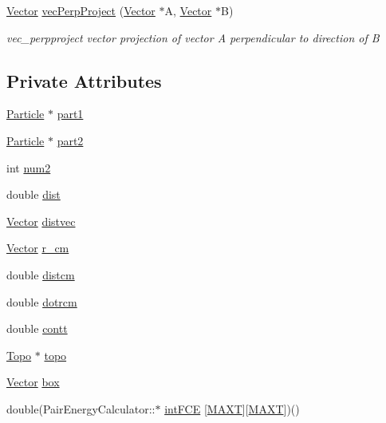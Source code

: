 \begin{DoxyCompactItemize}
\hyperlink{class_vector}{Vector} \hyperlink{class_pair_energy_calculator_abf018dcd60f682fbc69e7f3d59aec1b5}{vec\+Perp\+Project} (\hyperlink{class_vector}{Vector} $\ast$A, \hyperlink{class_vector}{Vector} $\ast$B)
\begin{DoxyCompactList}\small\item\em vec\+\_\+perpproject vector projection of vector A perpendicular to direction of B \end{DoxyCompactList}\end{DoxyCompactItemize}
\subsection*{Private Attributes}
\begin{DoxyCompactItemize}
\item 
\hyperlink{class_particle}{Particle} $\ast$ \hyperlink{class_pair_energy_calculator_a168122b4b21b48d25093a9e314045929}{part1}
\item 
\hyperlink{class_particle}{Particle} $\ast$ \hyperlink{class_pair_energy_calculator_a5930e66e7a0e9c3b2bd7e76391854ad2}{part2}
\item 
int \hyperlink{class_pair_energy_calculator_a437c68a040fd7eb9f261bc2c22cf3bcf}{num2}
\item 
double \hyperlink{class_pair_energy_calculator_a088da797962434ca91db0371df26658f}{dist}
\item 
\hyperlink{class_vector}{Vector} \hyperlink{class_pair_energy_calculator_a55811135e825d49327759d985d97b411}{distvec}
\item 
\hyperlink{class_vector}{Vector} \hyperlink{class_pair_energy_calculator_aa927503ba2066bfcd0fb072e0b7e12cc}{r\+\_\+cm}
\item 
double \hyperlink{class_pair_energy_calculator_a458286e3bf6945bcbbfbb8f6cf5176f5}{distcm}
\item 
double \hyperlink{class_pair_energy_calculator_a900648b1736a83a26032f362826a03b7}{dotrcm}
\item 
double \hyperlink{class_pair_energy_calculator_a65d98db836fcf54e21274113ba3f42c4}{contt}
\item 
\hyperlink{class_topo}{Topo} $\ast$ \hyperlink{class_pair_energy_calculator_a89462e46d51f1247121a58a71831d2a2}{topo}
\item 
\hyperlink{class_vector}{Vector} \hyperlink{class_pair_energy_calculator_a4c8925567dcb6e14f832a13474486d57}{box}
\item 
double(Pair\+Energy\+Calculator\+::$\ast$ \hyperlink{class_pair_energy_calculator_a59ee0e41cc441aa2138f978dbf68a070}{int\+F\+C\+E} \mbox{[}\hyperlink{macros_8h_a3f79fdecc884eb98c97d1bdc77455295}{M\+A\+X\+T}\mbox{]}\mbox{[}\hyperlink{macros_8h_a3f79fdecc884eb98c97d1bdc77455295}{M\+A\+X\+T}\mbox{]})()
\end{DoxyCompactItemize}


